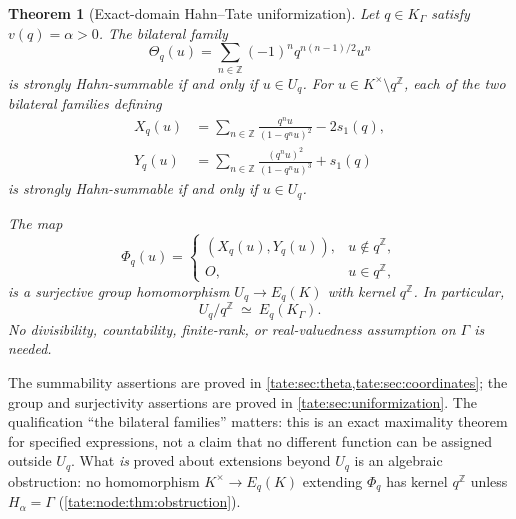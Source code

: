 \documentclass[11pt,letterpaper]{article}
\newtheorem{theorem}{Theorem}[section]
\theoremstyle{definition}
\newcommand{\Z}{\mathbb Z}
\begin{document}
\begin{theorem}[Exact-domain Hahn--Tate uniformization]\label{tate:thm:main}
Let $q\in K_\Gamma$ satisfy $v(q)=\alpha>0$.
The bilateral family
\begin{equation}
 \Theta_q(u)=\sum_{n\in\Z}(-1)^nq^{n(n-1)/2}u^n\label{tate:eq:theta}
\end{equation}
is strongly Hahn-summable if and only if $u\in U_q$.
For $u\in K^\times\setminus q^\Z$, each of the two bilateral families defining
\begin{align}
 X_q(u)&=\sum_{n\in\Z}\frac{q^nu}{(1-q^nu)^2}-2s_1(q),\label{tate:eq:X}\\
 Y_q(u)&=\sum_{n\in\Z}\frac{(q^nu)^2}{(1-q^nu)^3}+s_1(q)\label{tate:eq:Y}
\end{align}
is strongly Hahn-summable if and only if $u\in U_q$.

The map
\begin{equation}
 \Phi_q(u)=
 \begin{cases}(X_q(u),Y_q(u)),&u\notin q^\Z,\\ O,&u\in q^\Z,
 \end{cases}\label{tate:eq:phi}
\end{equation}
is a surjective group homomorphism $U_q\to E_q(K)$ with kernel $q^\Z$.
In particular,
\begin{equation}\boxed{\quad U_q/q^\Z\ \simeq\ E_q(K_\Gamma).\quad}\label{tate:eq:main}
\end{equation}
No divisibility, countability, finite-rank, or real-valuedness assumption
on $\Gamma$ is needed.
\end{theorem}

The summability assertions are proved in \cref{tate:sec:theta,tate:sec:coordinates};
the group and surjectivity assertions are proved in \cref{tate:sec:uniformization}.
The qualification ``the bilateral families'' matters: this is an exact
maximality theorem for specified expressions, not a claim that no different
function can be assigned outside $U_q$. What \emph{is} proved about
extensions beyond $U_q$ is an algebraic obstruction: no homomorphism
$K^\times\to E_q(K)$ extending $\Phi_q$ has kernel $q^\Z$ unless
$H_\alpha=\Gamma$ (\cref{tate:node:thm:obstruction}).
\end{document}
